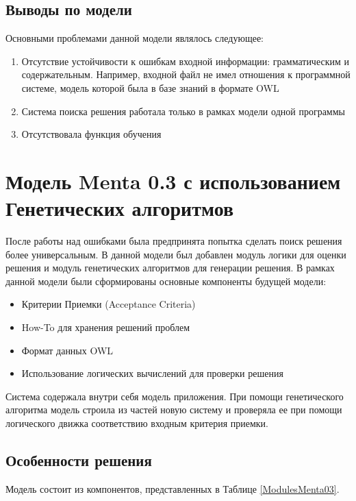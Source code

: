 \subsection{Выводы по модели}
Основными проблемами данной модели являлось следующее:
\begin{enumerate}
	\item Отсутствие устойчивости к ошибкам входной информации: грамматическим и содержательным. Например, входной файл не имел отношения к программной системе, модель которой была в базе знаний в формате OWL
	\item Система поиска решения работала только в рамках модели одной программы
	\item Отсутствовала функция обучения 
\end{enumerate}
\section{Модель Menta 0.3 с использованием Генетических алгоритмов} \label{chapt2}
После работы над ошибками была предпринята попытка сделать поиск решения более универсальным. В данной модели был добавлен модуль логики для оценки решения и модуль генетических алгоритмов для генерации решения. В рамках данной модели были сформированы основные компоненты будущей модели:
\begin{itemize}
	\item Критерии Приемки (Acceptance Criteria)
	\item How-To для хранения решений проблем
	\item Формат данных OWL 
	\item Использование логических вычислений для проверки решения
\end{itemize}
Система содержала внутри себя модель приложения. При помощи генетического алгоритма модель строила из частей новую систему и проверяла ее при помощи логического движка \cite{NARS} соответствию входным критерия приемки. 
\subsection{Особенности решения}
Модель состоит из компонентов, представленных в Таблице \ref{ModulesMenta03}.

